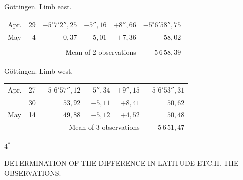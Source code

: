 \noindent\begin{minipage}[t]{.495\textwidth}\centering Göttingen. Limb east.\par\smallskip
{\scriptsize\setlength{\tabcolsep}{1pt}\renewcommand{\arraystretch}{1.2}\begin{tabular}{lr|r|r|r|r|}
Apr.&29&$-5^\circ7'2''{,}25$&$-5''{,}16$&$+8''{,}66$&$-5^\circ6'58''{,}75$\\
May&4&$0{,}37$&$-5{,}01$&$+7{,}36$&$58{,}02$\\
&&&&&\\
\cline{6-6}\multicolumn{5}{r}{Mean of 2 observations}&$-5\,6\,58{,}39$
\end{tabular}}\end{minipage}\hfill\begin{minipage}[t]{.495\textwidth}\centering Göttingen. Limb west.\par\smallskip
{\scriptsize\setlength{\tabcolsep}{1pt}\renewcommand{\arraystretch}{1.2}\begin{tabular}{lr|r|r|r|r}
Apr.&27&$-5^\circ6'57''{,}12$&$-5''{,}34$&$+9''{,}15$&$-5^\circ6'53''{,}31$\\
&30&$53{,}92$&$-5{,}11$&$+8{,}41$&$50{,}62$\\
May&14&$49{,}88$&$-5{,}12$&$+4{,}52$&$50{,}48$\\
\cline{6-6}\multicolumn{5}{r}{Mean of 3 observations}&$-5\,6\,51{,}47$
\end{tabular}}\end{minipage}
\par\vspace{4mm}
\begin{flushright}$4^{\ast}$\end{flushright}

\clearpage
\noindent{}\parbox[t]{\dimexpr\textwidth-10mm\relax}{\centering\scriptsize DETERMINATION OF THE DIFFERENCE IN LATITUDE ETC.\quad II. THE OBSERVATIONS.}\par


